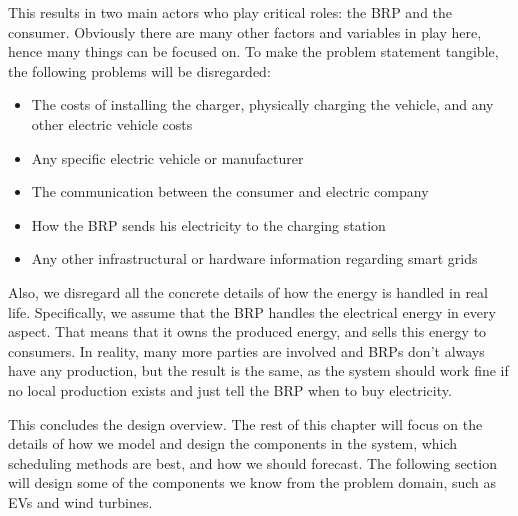 This results in two main actors who play critical roles: the BRP and the consumer. Obviously there are many other factors and variables in play here, hence many things can be focused on. To make the problem statement tangible, the following problems will be disregarded:
\begin{itemize}
  \item The costs of installing the charger, physically charging the vehicle, and any other electric vehicle costs
  \item Any specific electric vehicle or manufacturer
  \item The communication between the consumer and electric company
  \item How the BRP sends his electricity to the charging station
  \item Any other infrastructural or hardware information regarding smart grids
\end{itemize}
Also, we disregard all the concrete details of how the energy is handled in real life. Specifically, we assume that the BRP handles the electrical energy in every aspect. That means that it owns the produced energy, and sells this energy to consumers. In reality, many more parties are involved and BRPs don't always have any production, but the result is the same, as the system should work fine if no local production exists and just tell the BRP when to buy electricity.

This concludes the design overview. The rest of this chapter will focus on the details of how we model and design the components in the system, which scheduling methods are best, and how we should forecast. The following section will design some of the components we know from the problem domain, such as EVs and wind turbines. 
